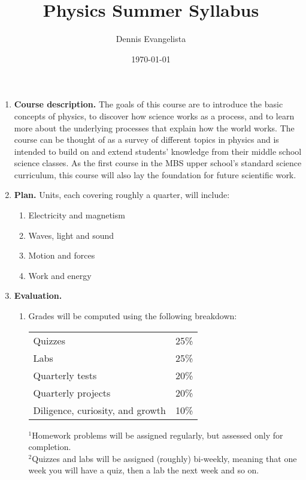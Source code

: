 \documentclass{article}
\title{Physics Summer Syllabus}
\author{Dennis Evangelista}
\date{\today}
\begin{document}

\begin{enumerate}
\item \textbf{Course description.} The goals of this course are to introduce the basic concepts of physics, to discover how science works as a process, and to learn more about the underlying processes that explain how the world works. The course can be thought of as a survey of different topics in physics and is intended to build on and extend students' knowledge from their middle school science classes. As the first course in the MBS upper school’s standard science curriculum, this course will also lay the foundation for future scientific work.

\item \textbf{Plan.} Units, each covering roughly a quarter, will include:
\begin{enumerate}
\item Electricity and magnetism
\item Waves, light and sound
\item Motion and forces
\item Work and energy
\end{enumerate}

\item \textbf{Evaluation.} 
\begin{enumerate}
\item Grades will be computed using the following breakdown:
\begin{table}[h]
\begin{center}
\begin{tabular}{ll}
\toprule
Quizzes & 25\% \\
Labs & 25\% \\
Quarterly tests & 20\% \\
Quarterly projects & 20\% \\
Diligence, curiosity, and growth & 10\% \\
\bottomrule
\end{tabular}
\end{center}
{\scriptsize
$^1$Homework problems will be assigned regularly, but assessed only for completion.\\
$^2$Quizzes and labs will be assigned (roughly) bi-weekly, meaning that one week you will have a quiz, then a lab the next week and so on.}
\end{table}


\end{enumerate}
\end{enumerate}
\end{document}
